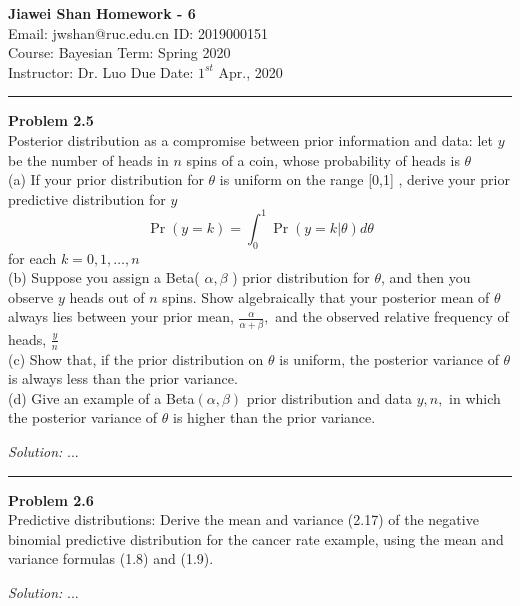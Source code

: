\documentclass[a4paper, 11pt]{article}
\newenvironment{problem}[2][Problem]
    { \begin{mdframed}[backgroundcolor=gray!20] \textbf{#1 #2} \\}
    {  \end{mdframed}}
\newenvironment{solution}
    {\textit{Solution:}}
    {}
\begin{document}
\noindent
\large\textbf{Jiawei Shan} \hfill \textbf{Homework - 6}   \\
Email: jwshan@ruc.edu.cn \hfill ID: 2019000151 \\
\normalsize Course: Bayesian \hfill Term: Spring 2020\\
Instructor: Dr. Luo  \hfill Due Date: $1^{st}$ Apr., 2020 \\
\noindent\rule{7in}{2.8pt}



\begin{problem}{2.5}
   Posterior distribution as a compromise between prior information and data: let $y$ be the number of heads in $n$ spins of a coin, whose probability of heads is $\theta$\\
  (a) If your prior distribution for $\theta$ is uniform on the range [0,1] , derive your prior predictive distribution for $y$
  $$
  \operatorname{Pr}(y=k)=\int_{0}^{1} \operatorname{Pr}(y=k | \theta) d \theta
  $$
  for each $k=0,1, \ldots, n$\\
  (b) Suppose you assign a Beta( $\alpha, \beta$ ) prior distribution for $\theta$, and then you observe $y$ heads out of $n$ spins. Show algebraically that your posterior mean of $\theta$ always lies between your prior mean, $\frac{\alpha}{\alpha+\beta},$ and the observed relative frequency of heads, $\frac{y}{n}$\\
  (c) Show that, if the prior distribution on $\theta$ is uniform, the posterior variance of $\theta$ is always less than the prior variance.\\
  (d) Give an example of a Beta$(\alpha, \beta)$ prior distribution and data $y, n,$ in which the posterior variance of $\theta$ is higher than the prior variance.
\end{problem}
\begin{solution}
...
\end{solution}

\noindent\rule{7in}{2.8pt}

\begin{problem}{2.6}
  Predictive distributions: Derive the mean and variance (2.17) of the negative binomial
  predictive distribution for the cancer rate example, using the mean and variance formulas
  (1.8) and (1.9).
\end{problem}
\begin{solution}
...
\end{solution}
\end{document}
